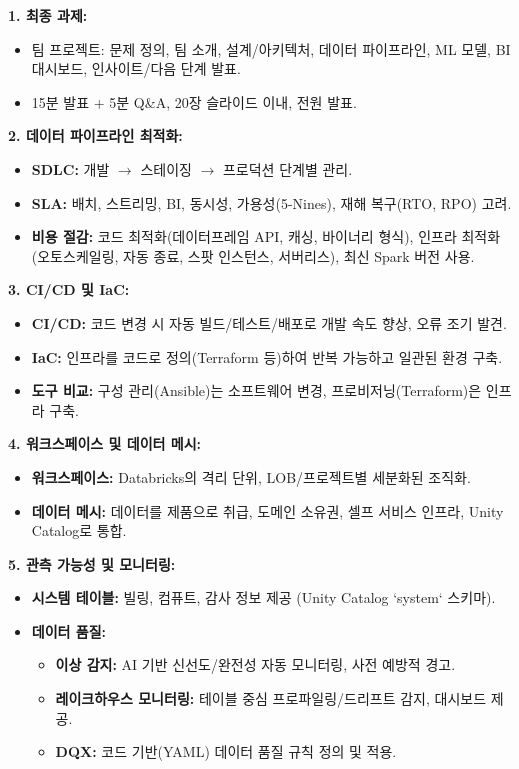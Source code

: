 \documentclass[11pt,a4paper]{article}
\begin{document}
\begin{tcolorbox}[colback=myblue!5!white, colframe=myblue!75!black, title=\textbf{CSCI103 Lecture 13 핵심 요약}]

\textbf{1. 최종 과제:}
\begin{itemize}
    \item 팀 프로젝트: 문제 정의, 팀 소개, 설계/아키텍처, 데이터 파이프라인, ML 모델, BI 대시보드, 인사이트/다음 단계 발표.
    \item 15분 발표 + 5분 Q\&A, 20장 슬라이드 이내, 전원 발표.
\end{itemize}

\textbf{2. 데이터 파이프라인 최적화:}
\begin{itemize}
    \item \textbf{SDLC:} 개발 $\rightarrow$ 스테이징 $\rightarrow$ 프로덕션 단계별 관리.
    \item \textbf{SLA:} 배치, 스트리밍, BI, 동시성, 가용성(5-Nines), 재해 복구(RTO, RPO) 고려.
    \item \textbf{비용 절감:} 코드 최적화(데이터프레임 API, 캐싱, 바이너리 형식), 인프라 최적화(오토스케일링, 자동 종료, 스팟 인스턴스, 서버리스), 최신 Spark 버전 사용.
\end{itemize}

\textbf{3. CI/CD 및 IaC:}
\begin{itemize}
    \item \textbf{CI/CD:} 코드 변경 시 자동 빌드/테스트/배포로 개발 속도 향상, 오류 조기 발견.
    \item \textbf{IaC:} 인프라를 코드로 정의(Terraform 등)하여 반복 가능하고 일관된 환경 구축.
    \item \textbf{도구 비교:} 구성 관리(Ansible)는 소프트웨어 변경, 프로비저닝(Terraform)은 인프라 구축.
\end{itemize}

\textbf{4. 워크스페이스 및 데이터 메시:}
\begin{itemize}
    \item \textbf{워크스페이스:} Databricks의 격리 단위, LOB/프로젝트별 세분화된 조직화.
    \item \textbf{데이터 메시:} 데이터를 제품으로 취급, 도메인 소유권, 셀프 서비스 인프라, Unity Catalog로 통합.
\end{itemize}

\textbf{5. 관측 가능성 및 모니터링:}
\begin{itemize}
    \item \textbf{시스템 테이블:} 빌링, 컴퓨트, 감사 정보 제공 (Unity Catalog `system` 스키마).
    \item \textbf{데이터 품질:}
    \begin{itemize}
        \item \textbf{이상 감지:} AI 기반 신선도/완전성 자동 모니터링, 사전 예방적 경고.
        \item \textbf{레이크하우스 모니터링:} 테이블 중심 프로파일링/드리프트 감지, 대시보드 제공.
        \item \textbf{DQX:} 코드 기반(YAML) 데이터 품질 규칙 정의 및 적용.
    \end{itemize}
\end{itemize}


\end{tcolorbox}
\end{document}
